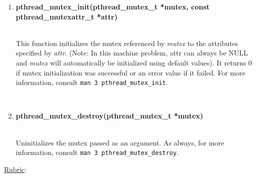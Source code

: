 \documentclass[12pt]{extarticle}
\newenvironment{myindentpar}[1]%
 {\begin{list}{}%
         {\setlength{\leftmargin}{#1}}%
         \item[]%
 }
 {\end{list}}
\newcommand{\code}[1]{\colorbox{codegray}{\texttt{#1}}}
\begin{document}
\begin{myindentpar}{5mm}
\begin{enumerate}
        \vspace{-7mm}
        \ \\
        \item \textbf{pthread\_mutex\_init(pthread\_mutex\_t *mutex, const pthread\_mutexattr\_t *attr)}
        
        \ \\
        This function initializes the mutex referenced by \emph{mutex} to the attributes specified by \emph{attr}.  (Note: In this machine problem, attr can always be NULL and \emph{mutex} will automatically be initialized using default values).  It returns 0 if mutex initialization was successful or an error value if it failed.  For more information, consult \code{man 3 pthread\_mutex\_init}.  

        \vspace{-7mm}
        \ \\        
        \item \textbf{pthread\_mutex\_destroy(pthread\_mutex\_t *mutex)}
        
        \ \\
        Uninitializes the mutex passed as an argument.  As always, for more information, consult \code{man 3 pthread\_mutex\_destroy}.  
        
    \end{enumerate}

\end{myindentpar}

\newpage
\noindent
{\large \underline{Rubric}:}
\end{document}

